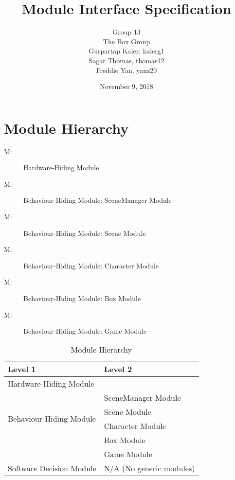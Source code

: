 \documentclass[12pt, titlepage]{article}
\title{Module Interface Specification}
\author{Group 13
        \\The Box Group
		\\ Gurpartap Kaler, kalerg1
		\\ Sagar Thomas, thomas12
		\\ Freddie Yan, yanz20}
\date{November 9, 2018}
\newcounter{mnum}
\newcommand{\mthemnum}{M\themnum}
\begin{document}
\maketitle
{}
\tableofcontents

\newpage

\section{Module Hierarchy}

\begin{description}
    \item [ \mthemnum \label{m1}:] Hardware-Hiding Module
    \item [ \mthemnum \label{m2}:] Behaviour-Hiding Module: SceneManager Module
     \item [ \mthemnum \label{m3}:] Behaviour-Hiding Module: Scene Module
    \item [ \mthemnum \label{m4}:] Behaviour-Hiding Module: Character Module
    \item [ \mthemnum \label{m5}:] Behaviour-Hiding Module: Box Module
    \item [ \mthemnum \label{m6}:] Behaviour-Hiding Module: Game Module
\end{description}

\begin{table}[h!]
\centering
\begin{tabular}{p{} p{}}
\toprule
\textbf{Level 1} & \textbf{Level 2}\\
\midrule

{Hardware-Hiding Module} & ~ \\
\midrule

\multirow{4}{0.3\textwidth}{Behaviour-Hiding Module} & SceneManager Module \\
& Scene Module \\
& Character Module\\
& Box Module\\
& Game Module\\
\midrule

\multirow{1}{0.3\textwidth}{Software Decision Module} & N/A (No generic modules) \\
\bottomrule

\end{tabular}
\caption{Module Hierarchy}
\label{TblMH}
\end{table}
\end{document}
